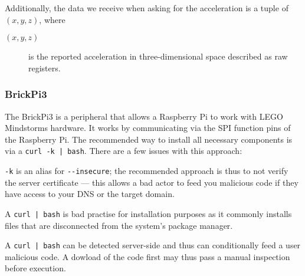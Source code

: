 Additionally, the data we receive when asking for the acceleration is a tuple of $(x, y, z)$, where
\begin{description}
\item[$(x, y, z)$] is the reported acceleration in three-dimensional space described as raw registers.
\end{description}




\subsubsection{BrickPi3}
The BrickPi3 is a peripheral that allows a Raspberry Pi to work with LEGO Mindstorms hardware.
It works by communicating via the SPI function pins of the Raspberry Pi.
The recommended way to install all necessary components is via a \texttt{curl -k | bash}.
There are a few issues with this approach:
\begin{inline-enum}
\item \verb|-k| is an alias for \verb|--insecure|;
  the recommended approach is thus to not verify the server certificate ---
  this allows a bad actor to feed you malicious code if they have access to your DNS or the target domain.
\item A \texttt{curl | bash} is bad practise for installation purposes as it commonly installs files that are disconnected from the system's package manager.
\item A \texttt{curl | bash} can be detected server-side and thus can conditionally feed a user malicious code.
  A dowload of the code first may thus pass a manual inspection before execution. \parencite{curl-bash}
\end{inline-enum}

